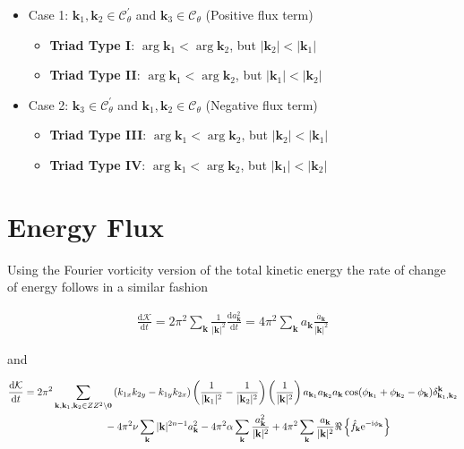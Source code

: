 \documentclass[9pt]{article}
\newcommand{\der}[2]{\frac{\mathrm{d}#1}{\mathrm{d}#2}}          	 %
\newcommand{\ii}{\mathrm{i}}      								  %
\newcommand{\e}{\mathrm{e}}      								  %
\newcommand{\bfk}{\mathbf{k}}								%
\newcommand{\bfkn}[1]{\mathbf{k}_{#1}}								%
\begin{document}
\begin{itemize}
\item Case 1: $\bfkn{1}, \bfkn{2} \in \mathcal{C}_{\theta}^{'}$ and $\bfkn{3} \in \mathcal{C}_{\theta}$ (Positive flux term)
	\begin{itemize}
		\item \textbf{Triad Type I}: $\arg{\bfkn{1}} < \arg{\bfkn{2}}$, but $|\bfkn{2}| < |\bfkn{1}|$ 
		\item \textbf{Triad Type II}: $\arg{\bfkn{1}} < \arg{\bfkn{2}}$, but $|\bfkn{1}| < |\bfkn{2}| $
	\end{itemize}
\item Case 2: $\bfkn{3} \in \mathcal{C}_{\theta}^{'}$ and $\bfkn{1}, \bfkn{2} \in \mathcal{C}_{\theta}$ (Negative flux term)
	\begin{itemize}
		\item \textbf{Triad Type III}: $\arg{\bfkn{1}} < \arg{\bfkn{2}}$, but $|\bfkn{2}| < |\bfkn{1}|$ 
		\item \textbf{Triad Type IV}: $\arg{\bfkn{1}} < \arg{\bfkn{2}}$, but $|\bfkn{1}| < |\bfkn{2}|$ 
	\end{itemize}
\end{itemize}




	

\section{Energy Flux}

Using the Fourier vorticity version of the total kinetic energy the rate of change of energy follows in a similar fashion

\begin{align}
	\der{\mathcal{K}}{t} = 2\pi^2\sum_{\bfk}  \frac{1}{|\bfk|^2}\der{a_\bfk^2}{t} =4\pi^2\sum_{\bfk} a_\bfk \frac{\dot{a}_\bfk}{|\bfk|^2}
\end{align}

and 

\begin{align}
	\der{\mathcal{K}}{t} &= 2\pi^2	\sum_{\bfk, \mathbf{k}_1, \mathbf{k}_2\in \mathbb{Z}^2\setminus \mathbf{0}}\left(k_{1x}k_{2y} - k_{1y}k_{2x}\right) \left(\frac{1}{|\bfkn{1}|^2} - \frac{1}{|\bfkn{2}|^2}\right) \left( \frac{1}{|\bfk|^2}\right)a_{\bfkn{1}} a_{\bfkn{2}} a_{\bfk} \cos(\phi_{\bfkn{1}} + \phi_{\bfkn{2}} - \phi_{\bfk})\delta_{\bfkn{1}, \bfkn{2}}^{\bfk} \notag \\ & \qquad \qquad \qquad \qquad- 4\pi^2\nu \sum_{\bfk}|\bfk|^{2n - 1} a_{\bfk}^2 - 4\pi^2\alpha\sum_{\bfk} \frac{a_\bfk^2}{|\bfk|^2} + 4\pi^2\sum_{\bfk}\frac{a_\bfk}{|\bfk|^2}\Re\left\{\hat{f}_{\bfk} \e^{-\ii\phi_\bfk}\right\}
\end{align}
\end{document}
